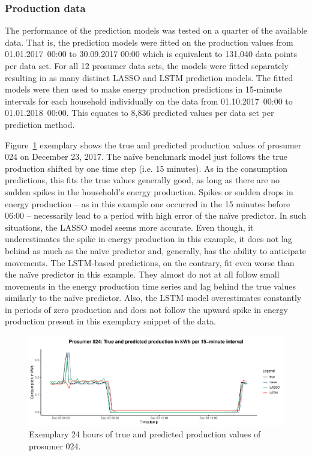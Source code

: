 \subsubsection{Production data}

The performance of the prediction models was tested on a quarter of the available data. That is, the prediction models were fitted on the production values from 01.01.2017~00:00 to 30.09.2017 00:00 which is equivalent to 131,040 data points per data set. For all 12 prosumer data sets, the models were fitted separately resulting in as many distinct LASSO and LSTM prediction models. The fitted models were then used to make energy production predictions in 15-minute intervals for each household individually on the data from 01.10.2017~00:00 to 01.01.2018~00:00. This equates to 8,836 predicted values per data set per prediction method.

Figure~\ref{Fig:glimpse_predprod} exemplary shows the true and predicted production values of prosumer 024 on December 23, 2017. The na\"ive benchmark model just follows the true production shifted by one time step (i.e. 15 minutes). As in the consumption predictions, this fits the true values generally good, as long as there are no sudden spikes in the household's energy production. Spikes or sudden drops in energy production -- as in this example one occurred in the 15 minutes before 06:00 -- necessarily lead to a period with high error of the na\"ive predictor. In such situations, the LASSO model seems more accurate. Even though, it underestimates the spike in energy production in this example, it does not lag behind as much as the na\"ive predictor and, generally, has the ability to anticipate movements. The LSTM-based predictions, on the contrary, fit even worse than the na\"ive predictor in this example. They almost do not at all follow small movements in the energy production time series and lag behind the true values similarly to the na\"ive predictor. Also, the LSTM model overestimates constantly in periods of zero production and does not follow the upward spike in energy production present in this exemplary snippet of the data.
%
\begin{figure}[htbp]
    \centering
    \includegraphics[width=\textwidth]{thesis/graphs/evaluation/p024_pred_prod.pdf}
    \caption[Exemplary 24 hours of true and predicted production values]{Exemplary 24 hours of true and predicted production values of prosumer 024. \quantnet\href{}{}}
    \label{Fig:glimpse_predprod}
\end{figure}
%


